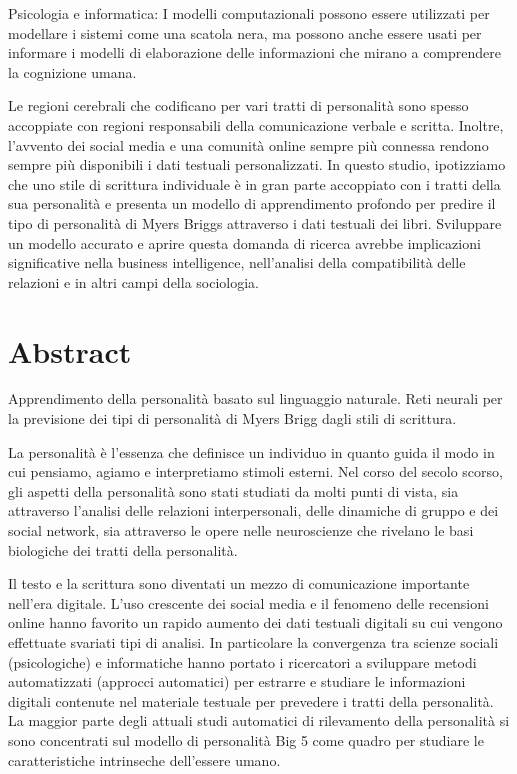 Psicologia e informatica:
I modelli computazionali possono essere utilizzati per modellare i sistemi come una scatola nera, ma possono anche essere usati per informare i modelli di elaborazione delle informazioni che mirano a comprendere la cognizione umana.




Le regioni cerebrali che codificano per vari tratti di personalità sono spesso accoppiate con regioni responsabili della comunicazione verbale e scritta. Inoltre, l'avvento dei social media e una comunità online sempre più connessa rendono sempre più disponibili i dati testuali personalizzati. In questo studio, ipotizziamo che uno stile di scrittura individuale è in gran parte accoppiato con i tratti della sua personalità e presenta un modello di apprendimento profondo per predire il tipo di personalità di Myers Briggs attraverso i dati testuali dei libri. Sviluppare un modello accurato e aprire questa domanda di ricerca avrebbe implicazioni significative nella business intelligence, nell'analisi della compatibilità delle relazioni e in altri campi della sociologia.










\chapter*{Abstract}
\label{Abstract}


Apprendimento della personalità basato sul linguaggio naturale. 
Reti neurali per la previsione dei tipi di personalità di Myers Brigg dagli stili di scrittura.






La personalità è l'essenza che definisce un individuo in quanto guida il modo in cui pensiamo, agiamo e interpretiamo stimoli esterni. 
Nel corso del secolo scorso, gli aspetti della personalità sono stati studiati da molti punti di vista, sia attraverso l'analisi delle relazioni interpersonali, delle dinamiche di gruppo e dei social network, sia attraverso le opere nelle neuroscienze che rivelano le basi biologiche dei tratti della personalità.


Il testo e la scrittura sono diventati un mezzo di comunicazione importante nell'era digitale. L'uso crescente dei social media e il fenomeno delle recensioni online hanno favorito un rapido aumento dei dati testuali digitali su cui vengono effettuate svariati tipi di analisi.
In particolare la convergenza tra scienze sociali (psicologiche) e informatiche hanno portato i ricercatori a sviluppare metodi automatizzati (approcci automatici) per estrarre e studiare le informazioni digitali contenute nel materiale testuale per prevedere i tratti della personalità.
La maggior parte degli attuali studi automatici di rilevamento della personalità si sono concentrati sul modello di personalità Big 5 come quadro per studiare le caratteristiche intrinseche dell'essere umano. 


